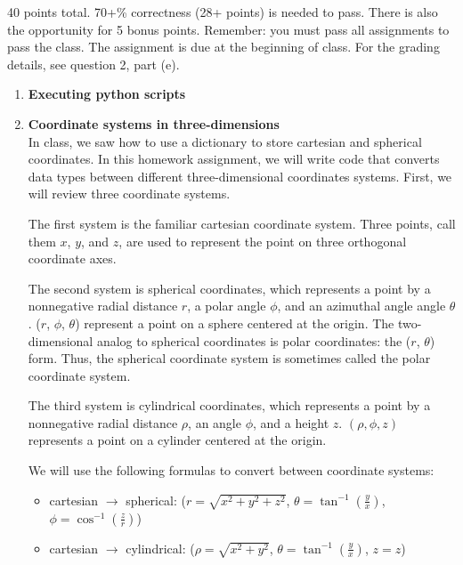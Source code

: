 \documentclass{article}
\newcounter{points}
\begin{document}
\pagestyle{fancy}

40 points total.  70+\% correctness (28+ points) is needed to pass.  There is also the opportunity for 5 bonus points.  Remember: you must pass all assignments to pass the class.  The assignment is due at the beginning of class.  For the grading details, see question 2, part (e).

\begin{enumerate}
\item \textbf{Executing python scripts} \\

\item \textbf{Coordinate systems in three-dimensions} \\
In class, we saw how to use a dictionary to store cartesian and spherical coordinates.  In this homework assignment, we will write code that converts data types between different three-dimensional coordinates systems.  First, we will review three coordinate systems.

The first system is the familiar cartesian coordinate system.  Three points, call them $x$, $y$, and $z$, are used to represent the point on three orthogonal coordinate axes.

The second system is spherical coordinates, which represents a point by a nonnegative radial distance $r$, a polar angle $\phi$, and an azimuthal angle angle $\theta$.  ($r$, $\phi$, $\theta$) represent a point on a sphere centered at the origin.  The two-dimensional analog to spherical coordinates is polar coordinates: the ($r$, $\theta$) form.  Thus, the spherical coordinate system is sometimes called the polar coordinate system.

The third system is cylindrical coordinates, which represents a point by a nonnegative radial distance $\rho$, an angle $\phi$, and a height $z$.  $(\rho, \phi, z)$ represents a point on a cylinder centered at the origin.

We will use the following formulas to convert between coordinate systems:

\begin{itemize}
\item{cartesian $\rightarrow$ spherical: ($r = \sqrt{x^2 + y^2 + z^2}$, $\theta = \tan^{-1}\left(\frac{y}{x}\right)$, $\phi = \cos^{-1}\left(\frac{z}{r}\right)$)}
\item{cartesian $\rightarrow$ cylindrical: ($\rho = \sqrt{x^2 + y^2}$, $\theta = \tan^{-1}\left(\frac{y}{x}\right)$, $z = z$)}


\end{itemize}
\end{enumerate}
\end{document}
